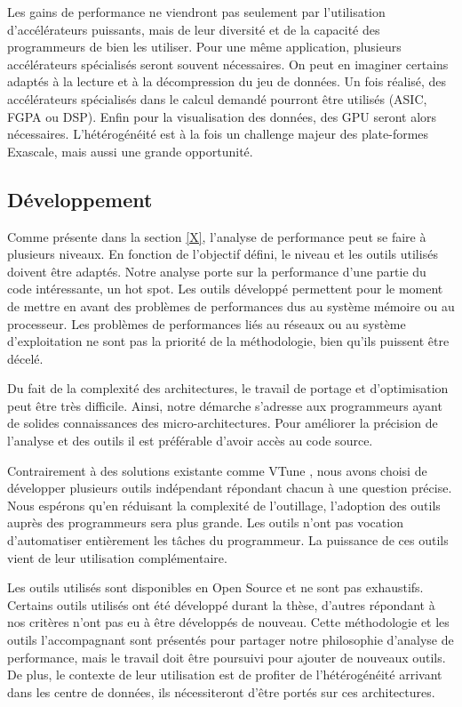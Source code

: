 Les gains de performance ne viendront pas seulement par l'utilisation d'accélérateurs puissants, mais de leur diversité et de la capacité des programmeurs de bien les utiliser. Pour une même application, plusieurs accélérateurs spécialisés seront souvent nécessaires. On peut en imaginer certains adaptés à la lecture et à la décompression du jeu de données. Un fois réalisé, des accélérateurs spécialisés dans le calcul demandé pourront être utilisés (ASIC, FGPA ou DSP). Enfin pour la visualisation des données, des GPU seront alors nécessaires. L'hétérogénéité est à la fois un challenge majeur des plate-formes Exascale, mais aussi une grande opportunité. 



\subsection{Développement}

Comme présente dans la section \ref{X}, l'analyse de performance peut se faire à plusieurs niveaux. En fonction de l'objectif défini, le niveau et les outils utilisés doivent être adaptés. Notre analyse porte sur la performance d'une partie du code intéressante, un hot spot. Les outils développé permettent pour le moment de mettre en avant des problèmes de performances dus au système mémoire ou au processeur. Les problèmes de performances liés au réseaux ou au système d'exploitation ne sont pas la priorité de la méthodologie, bien qu'ils puissent être décelé.

Du fait de la complexité des architectures, le travail de portage et d'optimisation peut être très difficile. Ainsi, notre démarche s'adresse aux programmeurs ayant de solides connaissances des micro-architectures. Pour améliorer la précision de l'analyse et des outils il est préférable d'avoir accès au code source. 

Contrairement à des solutions existante comme VTune \cite{vtune}, nous avons choisi de développer plusieurs outils indépendant répondant chacun à une question précise. Nous espérons qu'en réduisant la complexité de l'outillage, l'adoption des outils auprès des programmeurs sera plus grande. Les outils n'ont pas vocation d'automatiser entièrement les tâches du programmeur. La puissance de ces outils vient de leur utilisation complémentaire. 

Les outils utilisés sont disponibles en Open Source et ne sont pas exhaustifs. Certains outils utilisés ont été développé durant la thèse, d'autres répondant à nos critères n'ont pas eu à être développés de nouveau. Cette méthodologie et les outils l'accompagnant sont présentés pour partager notre philosophie d'analyse de performance, mais le travail doit être poursuivi pour ajouter de nouveaux outils. De plus, le contexte de leur utilisation est de profiter de l'hétérogénéité arrivant dans les centre de données, ils nécessiteront d'être portés sur ces architectures.



